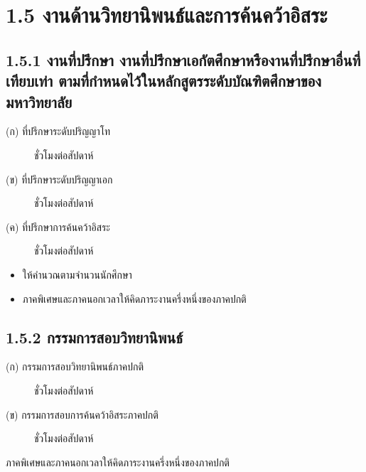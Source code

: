 \documentclass[a4paper,12pt,english]{sphinxmanual}
\begin{document}
\section{1.5 งานด้านวิทยานิพนธ์และการค้นคว้าอิสระ}
\label{\detokenize{1teaching:id17}}

\subsection{1.5.1 งานที่ปรึกษา งานที่ปรึกษาเอกัตศึกษาหรืองานที่ปรึกษาอื่นที่เทียบเท่า ตามที่กำหนดไว้ในหลักสูตรระดับบัณฑิตศึกษาของมหาวิทยาลัย}
\label{\detokenize{1teaching:id18}}\begin{description}
\item[{(ก) ที่ปรึกษาระดับปริญญาโท}]  ชั่วโมงต่อสัปดาห์

\item[{(ข) ที่ปรึกษาระดับปริญญาเอก}]  ชั่วโมงต่อสัปดาห์

\item[{(ค) ที่ปรึกษาการค้นคว้าอิสระ}]  ชั่วโมงต่อสัปดาห์

\end{description}
\begin{itemize}
\item {} 
ให้คำนวณตามจำนวนนักศึกษา

\item {} 
ภาคพิเศษและภาคนอกเวลาให้คิดภาระงานครึ่งหนึ่งของภาคปกติ

\end{itemize}


\subsection{1.5.2 กรรมการสอบวิทยานิพนธ์}
\label{\detokenize{1teaching:id19}}\begin{description}
\item[{(ก) กรรมการสอบวิทยานิพนธ์ภาคปกติ}]  ชั่วโมงต่อสัปดาห์

\item[{(ข) กรรมการสอบการค้นคว้าอิสระภาคปกติ}]  ชั่วโมงต่อสัปดาห์

\end{description}

ภาคพิเศษและภาคนอกเวลาให้คิดภาระงานครึ่งหนึ่งของภาคปกติ
\end{document}

